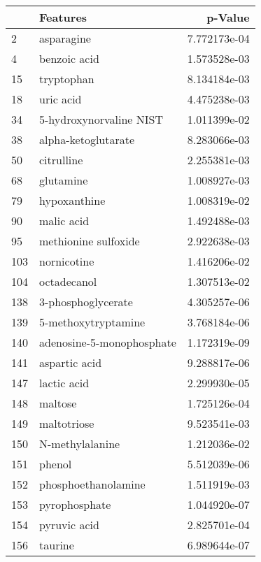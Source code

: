 \begin{tabular}{llr}
\toprule
{} &                   Features &       p-Value \\
\midrule
2   &                 asparagine &  7.772173e-04 \\
4   &               benzoic acid &  1.573528e-03 \\
15  &                 tryptophan &  8.134184e-03 \\
18  &                  uric acid &  4.475238e-03 \\
34  &    5-hydroxynorvaline NIST &  1.011399e-02 \\
38  &        alpha-ketoglutarate &  8.283066e-03 \\
50  &                 citrulline &  2.255381e-03 \\
68  &                  glutamine &  1.008927e-03 \\
79  &               hypoxanthine &  1.008319e-02 \\
90  &                 malic acid &  1.492488e-03 \\
95  &       methionine sulfoxide &  2.922638e-03 \\
103 &                nornicotine &  1.416206e-02 \\
104 &                octadecanol &  1.307513e-02 \\
138 &         3-phosphoglycerate &  4.305257e-06 \\
139 &        5-methoxytryptamine &  3.768184e-06 \\
140 &  adenosine-5-monophosphate &  1.172319e-09 \\
141 &              aspartic acid &  9.288817e-06 \\
147 &                lactic acid &  2.299930e-05 \\
148 &                    maltose &  1.725126e-04 \\
149 &                maltotriose &  9.523541e-03 \\
150 &            N-methylalanine &  1.212036e-02 \\
151 &                     phenol &  5.512039e-06 \\
152 &        phosphoethanolamine &  1.511919e-03 \\
153 &              pyrophosphate &  1.044920e-07 \\
154 &               pyruvic acid &  2.825701e-04 \\
156 &                    taurine &  6.989644e-07 \\
\bottomrule
\end{tabular}

